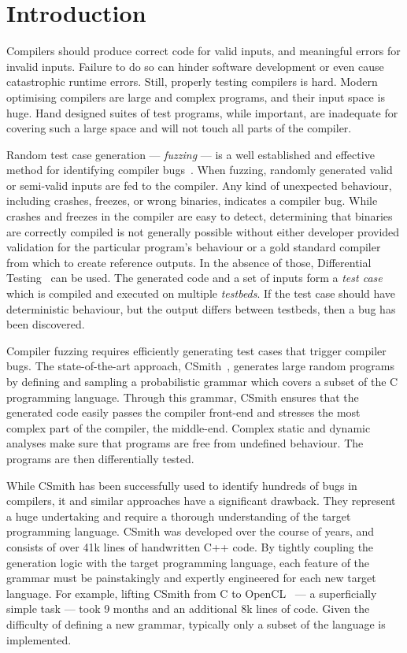 \section{Introduction}\label{sec:intro}

Compilers should produce correct code for valid inputs, and meaningful errors
for invalid inputs. Failure to do so can hinder software development or even
cause catastrophic runtime errors. Still, properly testing compilers is hard.
Modern optimising compilers are large and complex programs, and their input
space is huge. Hand designed suites of test programs, while important, are
inadequate for covering such a large space and will not touch all parts of the
compiler.

Random test case generation --- \emph{fuzzing} --- is a well established and
effective method for identifying compiler
bugs~\cite{Chen2014a,Chen2013,Kossatchev2005}. When fuzzing, randomly generated
valid or semi-valid inputs are fed to the compiler. Any kind of unexpected
behaviour, including crashes, freezes, or wrong binaries, indicates a compiler
bug. While crashes and freezes in the compiler are easy to detect, determining
that binaries are correctly compiled is not generally possible without either
developer provided validation for the particular program's behaviour or a gold
standard compiler from which to create reference outputs. In the absence of
those, Differential Testing~\cite{McKeeman1998} can be used. The generated code
and a set of inputs form a \emph{test case} which is compiled and executed on
multiple \emph{testbeds}. If the test case should have deterministic behaviour,
but the output differs between testbeds, then a bug has been discovered.

Compiler fuzzing requires efficiently generating test cases that trigger
compiler bugs. The state-of-the-art approach, CSmith~\cite{Yang2011}, generates
large random programs by defining and sampling a probabilistic grammar which
covers a subset of the C programming language. Through this grammar, CSmith
ensures that the generated code easily passes the compiler front-end and
stresses the most complex part of the compiler, the middle-end. Complex static
and dynamic analyses make sure that programs are free from undefined behaviour.
The programs are then differentially tested.

While CSmith has been successfully used to identify hundreds of bugs in
compilers, it and similar approaches have a significant drawback. They represent
a huge undertaking and require a thorough understanding of the target
programming language. CSmith was developed over the course of years, and
consists of over 41k lines of handwritten C++ code. By tightly coupling the
generation logic with the target programming language, each feature of the
grammar must be painstakingly and expertly engineered for each new target
language. For example, lifting CSmith from C to OpenCL~\cite{Lidbury2015a} --- a
superficially simple task --- took 9 months and an additional 8k lines of code.
Given the difficulty of defining a new grammar, typically only a subset of the
language is implemented.


